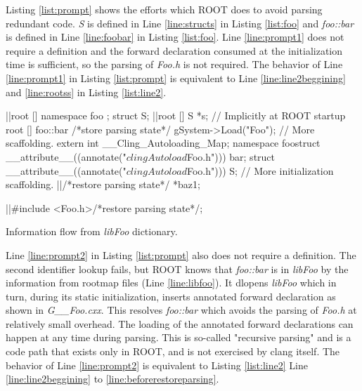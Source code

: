 \documentclass{webofc}
\begin{document}
Listing \ref{list:prompt} shows the efforts which ROOT does to avoid parsing redundant code. {\it S} is defined in Line \ref{line:structs} in Listing \ref{list:foo} and {\it foo::bar} is defined in Line \ref{line:foobar} in Listing \ref{list:foo}. Line \ref{line:prompt1} does not require a definition and the forward declaration consumed at the initialization time is sufficient, so the parsing of {\it Foo.h} is not required. The behavior of Line \ref{line:prompt1} in Listing \ref{list:prompt} is equivalent to Line \ref{line:line2beggining} and \ref{line:rootss} in Listing \ref{list:line2}.

\begin{listing}[h]
    \noindent
    \begin{minipage}[h]{.7\textwidth}
    \begin{cppcode*}{}
    |\label{line:line2beggining}|root [] namespace foo { }; struct S;
    |\label{line:rootss}|root [] S *s; // Implicitly at ROOT startup
    root [] foo::bar /*store parsing state*/
    gSystem->Load("Foo");
    // More scaffolding.
    extern int __Cling_Autoloading_Map;
    namespace foo{struct __attribute__((annotate("$clingAutoload$Foo.h"))) bar;}
    struct __attribute__((annotate("$clingAutoload$Foo.h"))) S;
    // More initialization scaffolding.
    |\label{line:beforerestoreparsing}|/*restore parsing state*/ *baz1;
    
    |\label{line:restoreparsing}|#include <Foo.h>/*restore parsing state*/;
    \end{cppcode*}
    \end{minipage}
    \caption{Information flow from {\it libFoo} dictionary.}
    \label{list:line2}
\end{listing}

Line \ref{line:prompt2} in Listing \ref{list:prompt} also does not require a definition. The second identifier lookup fails, but ROOT knows that {\it foo::bar} is in {\it libFoo} by the information from rootmap files (Line \ref{line:libfoo}). It dlopens {\it libFoo} which in turn, during its static initialization, inserts annotated forward declaration as shown in {\it G\_\_Foo.cxx}. This resolves {\it foo::bar} which avoids the parsing of {\it Foo.h} at relatively small overhead. The loading of the annotated forward declarations can happen at any time during parsing. This is so-called "recursive parsing" and is a code path that exists only in ROOT, and is not exercised by clang itself. The behavior of Line \ref{line:prompt2} is equivalent to Listing \ref{list:line2} Line \ref{line:line2beggining} to \ref{line:beforerestoreparsing}.
\end{document}
